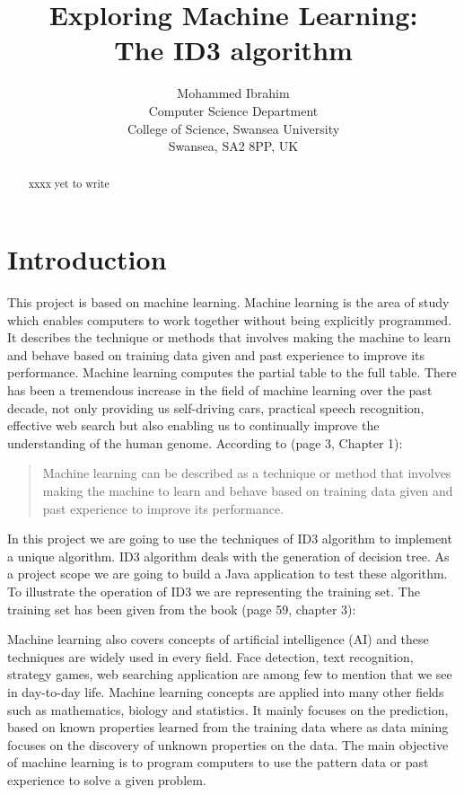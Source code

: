 \documentclass{article}
\begin{document}
\title{Exploring Machine Learning:\\
  The ID3 algorithm}

\author{Mohammed Ibrahim\\
 Computer Science Department\\
  College of Science, Swansea University\\
  Swansea, SA2 8PP, UK
}

\maketitle
\begin{abstract}
xxxx yet to write
\end{abstract}
\pagebreak
\tableofcontents
\pagebreak
\section{Introduction}
\label{sec:int}

This project is based on machine learning. Machine learning is the area of study which enables computers to work together without being explicitly programmed. It describes the technique or methods that involves making the machine to learn and behave based on training data given and past experience to improve its performance. Machine learning computes the partial table to the full table.
There has been a tremendous increase in the field of machine learning over the past decade, not only providing us self-driving cars, practical speech recognition,  effective web search but also enabling us to continually improve the understanding of the human genome. According to \cite{Alpaydin2010MachineLearning}(page 3, Chapter 1):
\begin{quote}
  Machine learning can be described as a technique or method that involves making the machine to learn and behave based on training data given and past experience to improve its performance. 
\end{quote}
In this project we are going to use the techniques of ID3 algorithm to implement a unique algorithm. ID3 algorithm deals with the generation of decision tree. As a project scope we are going to build a Java application to test these algorithm. To illustrate the operation of ID3 we are representing the training set. 
The training set has been given from the book \cite{Mitchell1997MachineLearning}(page 59, chapter 3):

Machine learning also covers concepts of artificial intelligence (AI) and these techniques are widely used in every field. Face detection, text recognition, strategy games, web searching application are among few to mention that we see in day-to-day life. Machine learning concepts are applied into many other fields such as mathematics, biology and statistics. It mainly focuses on the prediction, based on known properties learned from the training data where as data mining focuses on the discovery of unknown properties on the data.
The main objective of machine learning is to program computers to use the pattern data or past experience to solve a given problem.
\end{document}
